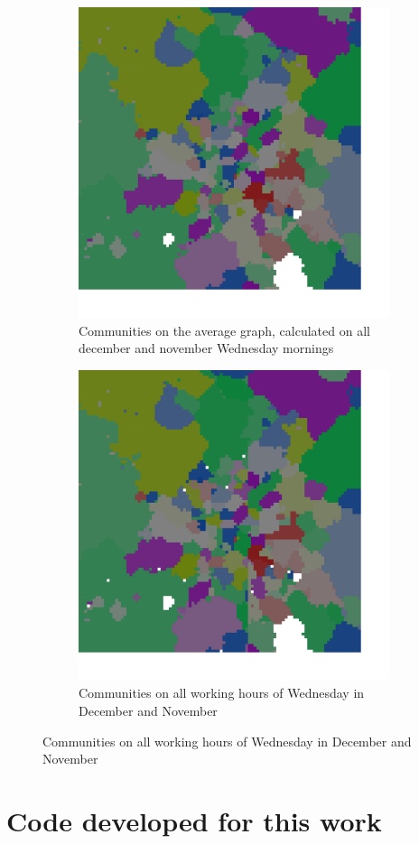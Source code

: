 \documentclass[12pt,a4paper]{article}
\begin{document}
\begin{figure}[H]
\begin{subfigure}[b]{0.48\textwidth}
\includegraphics[width=\textwidth]{week/wed/WedMatrix2.png}
\caption{Communities on the average graph, calculated on all december and november Wednesday mornings}
\end{subfigure}
\begin{subfigure}[b]{0.48\textwidth}
\includegraphics[width=\textwidth]{week/wed/Wed1.png}
\caption{Communities on all working hours of Wednesday in December and November}
\end{subfigure}
\end{figure}

\section{Code developed for this work}
\end{document}
